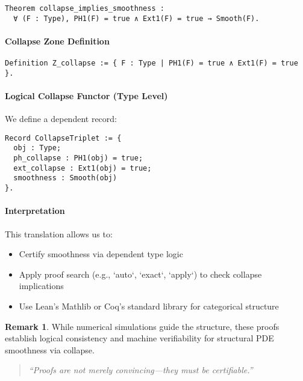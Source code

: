 \documentclass[11pt]{article}
\theoremstyle{definition}
\newtheorem{remark}[theorem]{Remark}
\begin{document}
\begin{verbatim}
Theorem collapse_implies_smoothness :
  ∀ (F : Type), PH1(F) = true ∧ Ext1(F) = true → Smooth(F).
\end{verbatim}

\paragraph{Collapse Zone Definition}

\begin{verbatim}
Definition Z_collapse := { F : Type | PH1(F) = true ∧ Ext1(F) = true }.
\end{verbatim}

\paragraph{Logical Collapse Functor (Type Level)}

We define a dependent record:

\begin{verbatim}
Record CollapseTriplet := {
  obj : Type;
  ph_collapse : PH1(obj) = true;
  ext_collapse : Ext1(obj) = true;
  smoothness : Smooth(obj)
}.
\end{verbatim}

\paragraph{Interpretation}

This translation allows us to:

\begin{itemize}
  \item Certify smoothness via dependent type logic
  \item Apply proof search (e.g., `auto`, `exact`, `apply`) to check collapse implications
  \item Use Lean’s Mathlib or Coq’s standard library for categorical structure
\end{itemize}

\begin{remark}
While numerical simulations guide the structure, these proofs establish logical consistency and machine verifiability for structural PDE smoothness via collapse.
\end{remark}

\begin{quote}
\textit{“Proofs are not merely convincing—they must be certifiable.”}
\end{quote}
\end{document}
